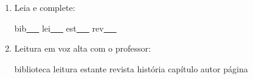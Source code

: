 \begin{exercicio}
\begin{enumerate}[resume]
\begin{enumerate}[label=(\alph*)]
    \item O som da unidade é: ( ) oral ( ) nasal ( ) vibrante

    \item A primeira sílaba de BIBLIOTECA é: ( ) LEI ( ) TEX

    \item As palavras da unidade aparecem: ( ) no início ( ) no meio ( ) no fim das palavras

  \end{enumerate}

  \item Leia e complete:
  \begin{center}
  bib\underline{~~~} \quad lei\underline{~~~} \quad est\underline{~~~} \quad rev\underline{~~~}
  \end{center}

  \item Leitura em voz alta com o professor:
  \begin{center}
  biblioteca \quad leitura \quad estante \quad revista \quad história \quad capítulo \quad autor \quad página
  \end{center}

\end{enumerate}

\end{exercicio}



